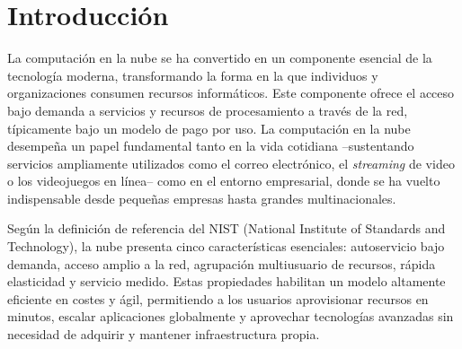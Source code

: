 \documentclass[12pt,twoside,titlepage]{report}
\begin{document}
\renewcommand{\chaptermark}[1]{\markboth{Capítulo \thechapter.\ #1}{}}

\pagestyle{fancy}
\fancyhf{}
\fancyhead[LO]{\leftmark}
\fancyhead[RO]{}
\fancyhead[RE]{\nouppercase\rightmark}
\fancyhead[LE]{}
\fancyfoot[C]{\thepage}










\chapter{Introducción}



\pagestyle{fancy}


\setlength{\parskip}{0.75em}
\renewcommand{\baselinestretch}{1.25}
\setcounter{page}{1}

La computación en la nube se ha convertido en un componente esencial de la tecnología moderna, transformando la forma en la que individuos y organizaciones consumen recursos informáticos. Este componente ofrece el acceso bajo demanda a servicios y recursos de procesamiento a través de la red, típicamente bajo un modelo de pago por uso. La computación en la nube desempeña un papel fundamental tanto en la vida cotidiana –sustentando servicios ampliamente utilizados como el correo electrónico, el \textit{streaming} de video o los videojuegos en línea– como en el entorno empresarial, donde se ha vuelto indispensable desde pequeñas empresas hasta grandes multinacionales. 

Según la definición de referencia del NIST (National Institute of Standards and Technology), la nube presenta cinco características esenciales: autoservicio bajo demanda, acceso amplio a la red, agrupación multiusuario de recursos, rápida elasticidad y servicio medido. Estas propiedades habilitan un modelo altamente eficiente en costes y ágil, permitiendo a los usuarios aprovisionar recursos en minutos, escalar aplicaciones globalmente y aprovechar tecnologías avanzadas sin necesidad de adquirir y mantener infraestructura propia.
\newpage
\end{document}
